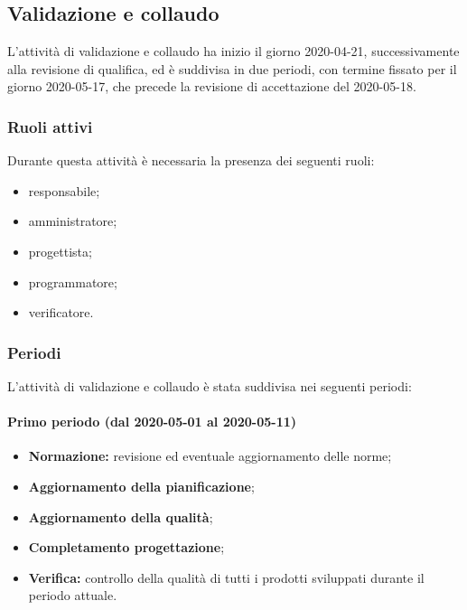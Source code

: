 
		\subsection{Validazione e collaudo}	
		
			L'attività di validazione e collaudo ha inizio il giorno 2020-04-21, successivamente alla revisione di qualifica, ed è suddivisa in due periodi, con termine fissato per il giorno 2020-05-17, che precede la revisione di accettazione del 2020-05-18.
			
			\subsubsection{Ruoli attivi}
			
			Durante questa attività è necessaria la presenza dei seguenti ruoli:
			\begin{itemize}
				\item responsabile;
				\item amministratore;
				\item progettista;
				\item programmatore;
				\item verificatore.
			\end{itemize}
			
			\subsubsection{Periodi}
			
				L'attività di validazione e collaudo è stata suddivisa nei seguenti periodi:
		
				\paragraph{Primo periodo (dal 2020-05-01 al 2020-05-11)}
			
					\begin{itemize}
						\item \textbf{Normazione:} revisione ed eventuale aggiornamento delle norme;
						\item \textbf{Aggiornamento della pianificazione};
						\item \textbf{Aggiornamento della qualità};
						\item \textbf{Completamento progettazione};
						\item \textbf{Verifica:} controllo della qualità di tutti i prodotti sviluppati durante il periodo attuale.
					\end{itemize} 	
				
